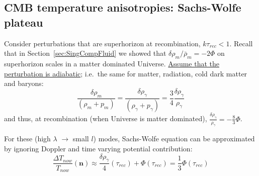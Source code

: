 \subsection{CMB temperature anisotropies: Sachs-Wolfe plateau}\label{sec:CMBSWPlateau}
Consider perturbations that are superhorizon at recombination, $k\tau_{rec}<1$. Recall that in Section~\ref{sec:SingCompFluid} we showed that $\delta \rho_m /\bar{\rho}_m = -2\Phi$ on superhorizon scales in a matter dominated Universe.
\underline{Assume that the perturbation is adiabatic}; i.e.\ the same for matter, radiation, cold dark matter and baryons:
\begin{equation}
    \frac{\delta \rho_m}{(\rho_m+p_m) } =\frac{\delta \rho_\gamma}{(\rho_\gamma+p_\gamma) } =\frac{3}{4}\frac{\delta \rho_\gamma}{\rho_\gamma} 
\end{equation}
and thus, at recombination (when Universe is matter dominated), $\frac{\delta \rho_\gamma}{\rho_\gamma} = -\frac{8}{3}\Phi$.

For these (high $\lambda$ $\rightarrow$ small $l$) modes, Sachs-Wolfe equation can be approximated by ignoring Doppler and time varying potential contribution:
\begin{equation}
    \frac{\Delta T_{now}}{T_{now}} (\mathbf{n}) \approx \frac{\delta \rho_\gamma}{4} (\tau_{rec}) + \Phi (\tau_{rec})= \frac{1}{3}\Phi(\tau_{rec})
\end{equation}

